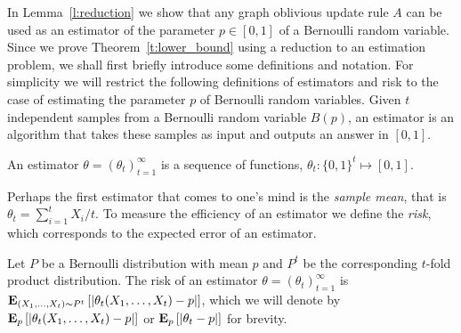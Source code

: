 In Lemma~\ref{l:reduction} we show that any graph oblivious update rule $A$
can be used as an estimator of the parameter $p \in [0,1] $ of a Bernoulli random
variable.
Since we prove Theorem~\ref{t:lower_bound} using a reduction to
an estimation problem, we shall first briefly introduce some definitions and
notation. For simplicity we will restrict the following definitions
of estimators and risk to the case of estimating the parameter $p$ of Bernoulli
random variables.
Given $t$ independent samples from a Bernoulli random variable $B(p)$,
an estimator is an algorithm that takes these samples as input and
outputs an answer in $[0,1]$.
\begin{definition}\label{d:estimator}
  An estimator $\theta=(\theta_t)_{t=1}^{\infty}$
  is a sequence of functions, $\theta_t: \{0,1\}^t\mapsto [0,1]$.
\end{definition}
Perhaps the first estimator that comes to one's mind is the
\emph{sample mean}, that is $\theta_t = \sum_{i=1}^t X_i/t$.
To measure the efficiency of an estimator we define the \emph{risk},
which corresponds to the expected error of an estimator.
\begin{definition}\label{d:risk}
  Let $P$ be a Bernoulli distribution with mean $p$ and
  $P^t$ be the corresponding $t$-fold product distribution.
  The risk of an estimator $\theta =(\theta_t)_{t=1}^\infty$ is
  $\bm{\mathrm{E}}_{(X_1,\ldots,X_t) \sim P^t} \left[ |\theta_t(X_1,\ldots,X_t) - p| \right]$,
  which we will denote by
  $\bm{\mathrm{E}}_{p} \left[ |\theta_t(X_1,\ldots,X_t) - p| \right]$ or
  $\bm{\mathrm{E}}_{p} \left[ |\theta_t - p| \right]$ for brevity.
\end{definition}
